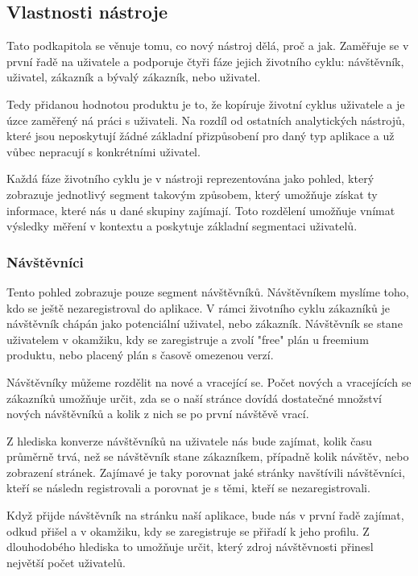\documentclass[bc,male,java,dept456]{diploma}						%
\begin{document}
\subsection{Vlastnosti nástroje}


Tato podkapitola se věnuje tomu, co nový nástroj dělá, proč a jak. Zaměřuje se v první řadě na uživatele a podporuje čtyři fáze jejich životního cyklu: návštěvník, uživatel, zá\-kaz\-ník a bývalý zákazník, nebo uživatel.

Tedy přidanou hodnotou produktu je to, že kopíruje životní cyklus uživatele a je úzce zaměřený ná práci s uživateli. Na rozdíl od ostatních analytických nástrojů, které jsou neposkytují žádné základní přizpůsobení pro daný typ aplikace a už vůbec nepracují s konkrétními uživatel.

Každá fáze životního cyklu je v nástroji reprezentována jako pohled, který zobrazuje jednotlivý segment takovým způsobem, který umožňuje získat ty informace, které nás u dané skupiny zajímají. Toto rozdělení umožňuje vnímat výsledky měření v kontextu a poskytuje základní segmentaci uživatelů.



\subsubsection{Návštěvníci}

Tento pohled zobrazuje pouze segment návštěvníků. Návštěvníkem myslíme toho, kdo se ještě nezaregistroval do aplikace. V rámci životního cyklu zákazníků je návštěvník chápán jako potenciální uživatel, nebo zákazník. Návštěvník se stane uživatelem v o\-ka\-mži\-ku, kdy se zaregistruje a zvolí "free" plán u freemium produktu, nebo placený plán s časově omezenou verzí.

Návštěvníky můžeme rozdělit na nové a vracející se. Počet nových a vracejících se zákazníků umožňuje určit, zda se o naší stránce dovídá dostatečné množství nových návštěvníků a kolik z nich se po první návštěvě vrací. 

Z hlediska konverze návštěvníků na uživatele nás bude zajímat, kolik času průměrně trvá, než se návštěvník stane zákazníkem, případně kolik návštěv, nebo zobrazení stránek. Zajímavé je taky porovnat jaké stránky navštívili návštěvníci, kteří se následn registrovali a porovnat je s těmi, kteří se nezaregistrovali.

Když přijde návštěvník na stránku naší aplikace, bude nás v první řadě zajímat, odkud přišel a v okamžiku, kdy se zaregistruje se přiřadí k jeho profilu. Z dlouhodobého hlediska to umožňuje určit, který zdroj návštěvnosti přinesl největší počet uživatelů. 
\end{document}
